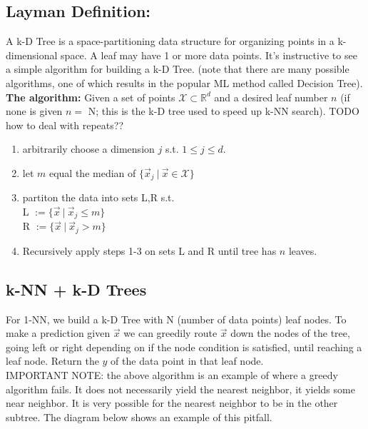 \documentclass[10pt]{article}
\begin{document}
	\subsection*{Layman Definition:} 
		A  k-D Tree is a space-partitioning data structure for organizing points in a k-dimensional space. A leaf may 
		have 1 or more data points. It's instructive to see a simple algorithm for building a k-D Tree. (note that 
		there are many possible algorithms, one of which results in the popular ML method called Decision Tree).  \\ 

		\noindent \textbf{The algorithm:} Given a set of points $\mathcal X \subset \mathbb{R}^d$ and a desired 
		leaf number $n$ (if none is given $n = $ N; this is the k-D tree used to speed up k-NN search). 
		TODO how to deal with repeats??
	
		\begin{enumerate}
			\item arbitrarily choose a dimension $j$ s.t. $1 \leq j \leq d$. 
			\item let $m$ equal the median of $ \{ \vec x_j \ | \ \vec x \in \mathcal X \} $
			\item partiton the data into sets L,R s.t. \\
				L $:= \{\vec x \ | \ \vec x_j \leq m \}$\\
				R $:= \{\vec x \ | \ \vec x_j > m \}$
			\item Recursively apply steps 1-3 on sets L and R until tree has $n$ leaves. 
		\end{enumerate} 
	
	\subsection*{k-NN + k-D Trees}
		For 1-NN, we build a k-D Tree with N (number of data points) leaf nodes. To make a prediction given 
		$\vec x $ we can greedily route $\vec x$ down the nodes of the tree, going left or right depending on 
		if the node condition is satisfied, until reaching a leaf node. Return the $y$ of the data point in that leaf node.  \\
	
		\noindent IMPORTANT NOTE:  the above algorithm is an example of where a greedy algorithm fails. 
		It does not necessarily yield the nearest neighbor, it yields some near neighbor. It is very possible for 
		the nearest neighbor to be in the other subtree. The diagram below shows an example of this pitfall. \\
		
\end{document}
